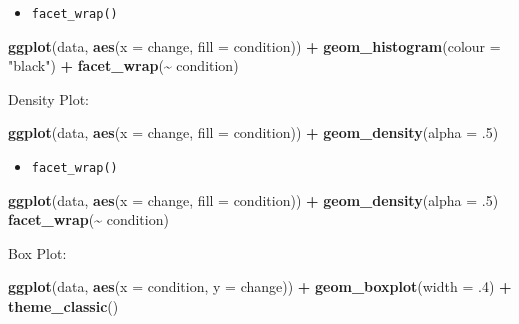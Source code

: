 \documentclass[
]{book}
\newenvironment{Shaded}{\begin{snugshade}}{\end{snugshade}}
\newcommand{\AttributeTok}[1]{\textcolor[rgb]{0.13,0.29,0.53}{#1}}
\newcommand{\DecValTok}[1]{\textcolor[rgb]{0.00,0.00,0.81}{#1}}
\newcommand{\FunctionTok}[1]{\textcolor[rgb]{0.13,0.29,0.53}{\textbf{#1}}}
\newcommand{\NormalTok}[1]{#1}
\newcommand{\SpecialCharTok}[1]{\textcolor[rgb]{0.81,0.36,0.00}{\textbf{#1}}}
\newcommand{\StringTok}[1]{\textcolor[rgb]{0.31,0.60,0.02}{#1}}
\providecommand{\tightlist}{%
  \setlength{\itemsep}{0pt}\setlength{\parskip}{0pt}}
\begin{document}
\begin{itemize}
\tightlist
\item
  \texttt{facet\_wrap()}
\end{itemize}

\begin{Shaded}
\begin{Highlighting}[]
\FunctionTok{ggplot}\NormalTok{(data, }\FunctionTok{aes}\NormalTok{(}\AttributeTok{x =}\NormalTok{ change, }\AttributeTok{fill =}\NormalTok{ condition)) }\SpecialCharTok{+}
      \FunctionTok{geom\_histogram}\NormalTok{(}\AttributeTok{colour =} \StringTok{"black"}\NormalTok{) }\SpecialCharTok{+}
      \FunctionTok{facet\_wrap}\NormalTok{(}\SpecialCharTok{\textasciitilde{}}\NormalTok{ condition)}
\end{Highlighting}
\end{Shaded}

Density Plot:

\begin{Shaded}
\begin{Highlighting}[]
\FunctionTok{ggplot}\NormalTok{(data, }\FunctionTok{aes}\NormalTok{(}\AttributeTok{x =}\NormalTok{ change, }\AttributeTok{fill =}\NormalTok{ condition)) }\SpecialCharTok{+}
      \FunctionTok{geom\_density}\NormalTok{(}\AttributeTok{alpha =}\NormalTok{ .}\DecValTok{5}\NormalTok{)}
\end{Highlighting}
\end{Shaded}

\begin{itemize}
\tightlist
\item
  \texttt{facet\_wrap()}
\end{itemize}

\begin{Shaded}
\begin{Highlighting}[]
\FunctionTok{ggplot}\NormalTok{(data, }\FunctionTok{aes}\NormalTok{(}\AttributeTok{x =}\NormalTok{ change, }\AttributeTok{fill =}\NormalTok{ condition)) }\SpecialCharTok{+}
      \FunctionTok{geom\_density}\NormalTok{(}\AttributeTok{alpha =}\NormalTok{ .}\DecValTok{5}\NormalTok{)}
      \FunctionTok{facet\_wrap}\NormalTok{(}\SpecialCharTok{\textasciitilde{}}\NormalTok{ condition)}
\end{Highlighting}
\end{Shaded}

Box Plot:

\begin{Shaded}
\begin{Highlighting}[]
\FunctionTok{ggplot}\NormalTok{(data, }\FunctionTok{aes}\NormalTok{(}\AttributeTok{x =}\NormalTok{ condition, }\AttributeTok{y =}\NormalTok{ change)) }\SpecialCharTok{+}
      \FunctionTok{geom\_boxplot}\NormalTok{(}\AttributeTok{width =}\NormalTok{ .}\DecValTok{4}\NormalTok{) }\SpecialCharTok{+}
      \FunctionTok{theme\_classic}\NormalTok{()}
\end{Highlighting}
\end{Shaded}
\end{document}
